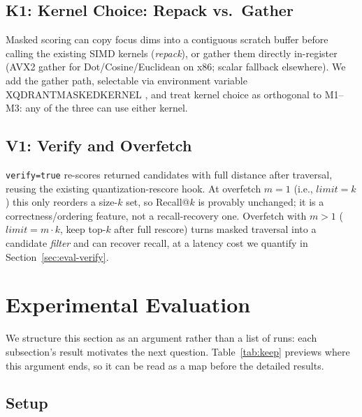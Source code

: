 \documentclass[sigconf,review,balance=false]{acmart}
\newcommand{\breakablecode}[1]{%
  {\ttfamily
    \renewcommand{\_}{\textunderscore\allowbreak}%
    #1%
  }}
\begin{document}
\subsection{K1: Kernel Choice: Repack vs.\ Gather}

Masked scoring can copy focus dims into a contiguous scratch buffer before
calling the existing SIMD kernels (\emph{repack}), or gather them directly
in-register (AVX2 gather for Dot/Cosine/Euclidean on x86; scalar fallback
elsewhere). We add the gather path, selectable via environment variable
\breakablecode{XQDRANT\_MASKED\_KERNEL}, and treat kernel choice as
orthogonal to M1--M3: any of the three can use either kernel.

\subsection{V1: Verify and Overfetch}

\texttt{verify=true} re-scores returned candidates with full distance after
traversal, reusing the existing quantization-rescore hook. At overfetch
$m{=}1$ (i.e., $\mathit{limit}=k$) this only reorders a size-$k$ set, so
Recall@$k$ is provably unchanged; it is a correctness/ordering feature, not a
recall-recovery one. Overfetch with $m>1$ ($\mathit{limit}=m\cdot k$, keep
top-$k$ after full rescore) turns masked traversal into a candidate
\emph{filter} and can recover recall, at a latency cost we quantify in
Section~\ref{sec:eval-verify}.

\section{Experimental Evaluation}
\label{sec:eval}

We structure this section as an argument rather than a list of runs: each
subsection's result motivates the next question. Table~\ref{tab:keep}
previews where this argument ends, so it can be read as a map before the
detailed results.

\subsection{Setup}
\end{document}
